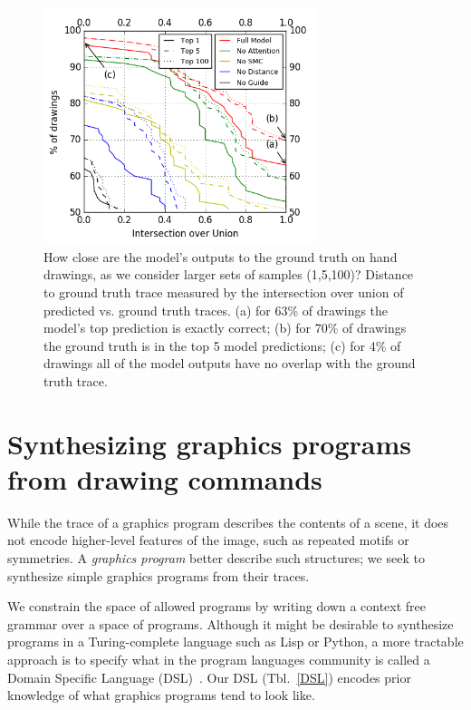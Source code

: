 \documentclass{article}
\begin{document}
\begin{figure}[h]\centering
  \begin{minipage}[c]{0.57\textwidth} 
    \centering  \includegraphics[width = 8cm]{figures/drawingAccuracy.png}
  \end{minipage}\hfill%
      \begin{minipage}[c]{0.4\textwidth} 
  \caption{How close are the model's outputs to the ground truth on hand drawings, as we consider larger sets of samples (1,5,100)?
    Distance to ground truth trace measured by the intersection over union of predicted vs. ground truth traces. (a) for 63\% of drawings the model's top prediction is exactly correct; (b) for 70\% of drawings the ground truth is in the top 5 model predictions; (c) for 4\% of drawings all of the model outputs have no overlap with the ground truth trace.}\label{drawingIntersectionOverUnion}
    \end{minipage}
\end{figure}




\section{Synthesizing graphics programs from drawing commands}\label{programSynthesisSection}
While the trace of a graphics program describes the contents
of a scene, it does not encode higher-level features of the image,
such as repeated motifs or symmetries.  A \emph{graphics
  program} better describe such structures;
we seek to synthesize simple graphics programs from their traces.

We constrain the space of allowed programs by writing down a context
free grammar over a space of programs. Although it might be desirable
to synthesize programs in a Turing-complete language such as Lisp or
Python, a more tractable approach is to specify what in the program
languages community is called a Domain Specific Language (DSL)~\cite{polozov2015flashmeta}. Our DSL (Tbl.~\ref{DSL})
encodes prior knowledge of what graphics programs tend to look like.
\end{document}

